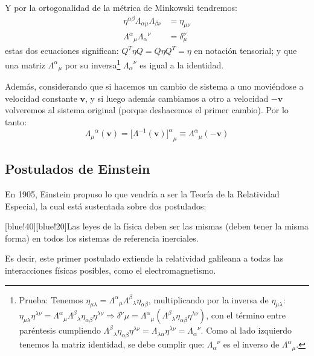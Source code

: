 \documentclass[]{article}
\numberwithin{equation}{section}
\begin{document}
Y por la ortogonalidad de la métrica de Minkowski tendremos:
\begin{align}
	\eta^{\alpha\beta} \Lambda_{\alpha\mu} \Lambda_{\beta\nu} &= \eta_{\mu\nu}\\
	{\Lambda^\alpha}_\mu {\Lambda_\alpha}^\nu &= \delta^\nu_\mu
\end{align}
estas dos ecuaciones significan: $Q^T\eta Q=Q\eta Q^T=\eta$ en notación tensorial; y que una matriz ${\Lambda^\alpha}_\mu$ por su inversa\footnote{Prueba: Tenemos $\eta_{\mu\lambda} = {\Lambda^\alpha}_\mu {\Lambda^\beta}_\lambda \eta_{\alpha\beta}$, multiplicando por la inversa de $\eta_{\mu\lambda}$: $\eta_{\mu\lambda}\eta^{\lambda\nu} = {\Lambda^\alpha}_\mu {\Lambda^\beta}_\lambda \eta_{\alpha\beta} \eta^{\lambda\nu} \Rightarrow \delta^\nu\mu = {\Lambda^\alpha}_\mu ({\Lambda^\beta}_\lambda \eta_{\alpha\beta} \eta^{\lambda\nu})$, con el término entre paréntesis cumpliendo ${\Lambda^\beta}_\lambda \eta_{\alpha\beta} \eta^{\lambda\nu} = \Lambda_{\lambda\alpha} \eta^{\lambda\nu} = {\Lambda_\alpha}^\nu$. Como al lado izquierdo tenemos la matriz identidad, se debe cumplir que: ${\Lambda_\alpha}^\nu$ es el inverso de ${\Lambda^\alpha}_\mu$.} ${\Lambda_\alpha}^\nu$ es igual a la identidad.

Además, considerando que si hacemos un cambio de sistema a uno moviéndose a velocidad constante $\mathbf{v}$, y si luego además cambiamos a otro a velocidad $-\mathbf{v}$ volveremos al sistema original (porque deshacemos el primer cambio). Por lo tanto:
\begin{equation}
	{\Lambda_\mu}^\alpha(\mathbf{v}) = [{\Lambda^{-1}(\mathbf{v})]^\alpha}_\mu \equiv {\Lambda^\alpha}_\mu(-\mathbf{v})
\end{equation}

\subsection{Postulados de Einstein}
En 1905, Einstein propuso lo que vendría a ser la Teoría de la Relatividad Especial, la cual está sustentada sobre dos postulados:

[blue!40][blue!20]{Las leyes de la física deben ser las mismas (deben tener la misma forma) en todos los sistemas de referencia inerciales.}

Es decir, este primer postulado extiende la relatividad galileana a todas las interacciones físicas posibles, como el electromagnetismo.
\end{document}
